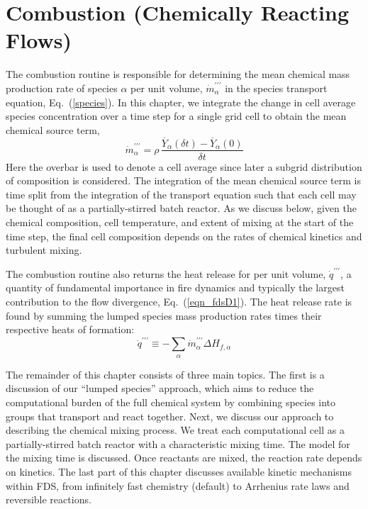 
\chapter{Combustion (Chemically Reacting Flows)}
\label{chapter:combustion}

\label{combustionsection}
The combustion routine is responsible for determining the mean chemical mass production rate of species $\alpha$ per unit volume, $\dot{m}^{\prime\prime\prime}_{\alpha}$ in the species transport equation, Eq.~(\ref{species}). In this chapter, we integrate the change in cell average species concentration over a time step for a single grid cell to obtain the mean chemical source term,
\begin{equation}\label{eq:m_tprime_alpha}
\dot{m}^{\prime\prime\prime}_{\alpha}=\rho \,\frac{\overline{Y}_\alpha(\delta t) - \overline{Y}_\alpha(0)}{\delta t}
\end{equation}
Here the overbar is used to denote a cell average since later a subgrid distribution of composition is considered.  The integration of the mean chemical source term is time split from the integration of the transport equation such that each cell may be thought of as a partially-stirred batch reactor.  As we discuss below, given the chemical composition, cell temperature, and extent of mixing at the start of the time step, the final cell composition depends on the rates of chemical kinetics and turbulent mixing.

The combustion routine also returns the heat release for per unit volume, $\dot{q}^{\prime\prime\prime}$, a quantity of fundamental importance in fire dynamics and typically the largest contribution to the flow divergence, Eq.~(\ref{eqn_fdsD1}).  The heat release rate is found by summing the lumped species mass production rates times their respective heats of formation:
\begin{equation}\label{eq:q_tprime}
\dot{q}^{\prime\prime\prime} \equiv -\displaystyle \sum_{\alpha} \dot{m}_\alpha^{\prime\prime\prime} \Delta H_{f,\alpha}
\end{equation}

The remainder of this chapter consists of three main topics.  The first is a discussion of our ``lumped species'' approach, which aims to reduce the computational burden of the full chemical system by combining species into groups that transport and react together.  Next, we discuss our approach to describing the chemical mixing process.  We treat each computational cell as a partially-stirred batch reactor with a characteristic mixing time.  The model for the mixing time is discussed.  Once reactants are mixed, the reaction rate depends on kinetics.  The last part of this chapter discusses available kinetic mechanisms within FDS, from infinitely fast chemistry (default) to Arrhenius rate laws and reversible reactions.

